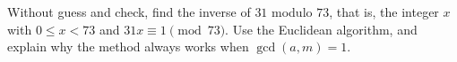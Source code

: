 Without guess and check, find the inverse of $31$ modulo $73$, that is, the integer $x$ with $0\le x<73$ and $31x\equiv1\pmod{73}$. Use the Euclidean algorithm, and explain why the method always works when $\gcd(a,m)=1$.
